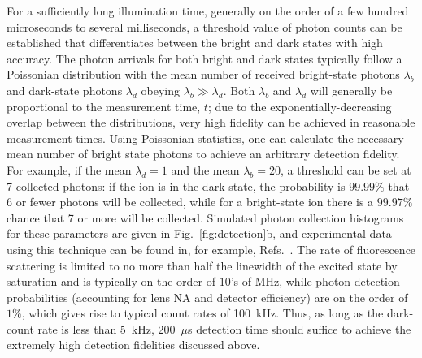 \documentclass[%
reprint,
 amsmath,amssymb,
]{revtex4-1}
\newcommand{\zero}{|0 \rangle}
\newcommand{\one}{|1 \rangle}
\begin{document}

For a sufficiently long illumination time, generally on the order of a few hundred microseconds to several milliseconds, a threshold value of photon counts can be established that differentiates between the bright and dark states with high accuracy. The photon arrivals for both bright and dark states typically follow a Poissonian distribution with the mean number of received bright-state photons $\lambda_b$ and dark-state photons $\lambda_d$ obeying $\lambda_b \gg \lambda_d$. Both $\lambda_b$ and $\lambda_d$ will generally be proportional to the measurement time, $t$; due to the exponentially-decreasing overlap between the distributions, very high fidelity can be achieved in reasonable measurement times. Using Poissonian statistics, one can calculate the necessary mean number of bright state photons to achieve an arbitrary detection fidelity. For example, if the mean $\lambda_d = 1$ and the mean $\lambda_b = 20$, a threshold can be set at 7 collected photons: if the ion is in the dark state, the probability is $99.99 \%$ that 6 or fewer photons will be collected, while for a bright-state ion there is a $99.97 \%$ chance that 7 or more will be collected. Simulated photon collection histograms for these parameters are given in Fig.~\ref{fig:detection}b, and experimental data using this technique can be found in, for example, Refs.~\cite{itano1988precise,NIST:HifiMicrogate:12}.  The rate of fluorescence scattering is limited to no more than half the linewidth of the excited state by saturation and is typically on the order of $10$'s of MHz, while photon detection probabilities (accounting for lens NA and detector efficiency) are on the order of $1 \%$, which gives rise to typical count rates of 100~kHz. Thus, as long as the dark-count rate is less than 5~kHz, 200~$\mu$s detection time should suffice to achieve the extremely high detection fidelities discussed above.
\end{document}
